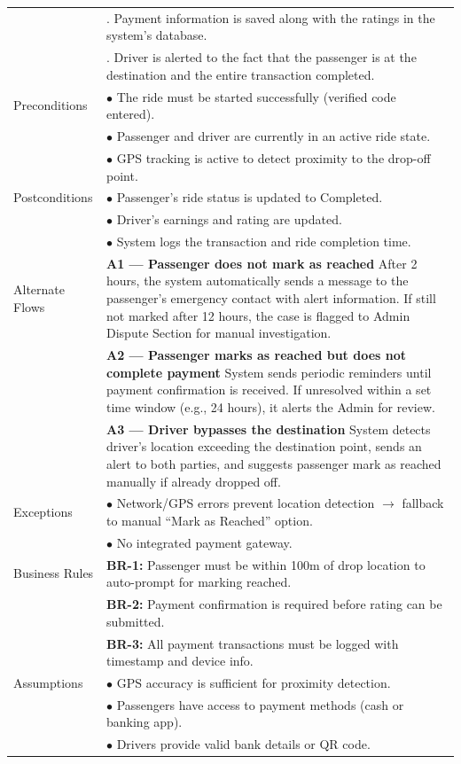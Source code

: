\begin{longtable}{|>{\raggedright\arraybackslash}p{4cm}|>{\raggedright\arraybackslash}p{11cm}|}
& 9. Payment information is saved along with the ratings in the system's database. \\
& 10. Driver is alerted to the fact that the passenger is at the destination and the entire transaction completed. \\
\hline
Preconditions & $\bullet$ The ride must be started successfully (verified code entered). \\
& $\bullet$ Passenger and driver are currently in an active ride state. \\
& $\bullet$ GPS tracking is active to detect proximity to the drop-off point. \\
\hline
Postconditions & $\bullet$ Passenger's ride status is updated to Completed. \\
& $\bullet$ Driver's earnings and rating are updated. \\
& $\bullet$ System logs the transaction and ride completion time. \\
\hline
Alternate Flows & \textbf{A1 — Passenger does not mark as reached} \newline After 2 hours, the system automatically sends a message to the passenger's emergency contact with alert information. If still not marked after 12 hours, the case is flagged to Admin Dispute Section for manual investigation. \\
& \textbf{A2 — Passenger marks as reached but does not complete payment} \newline System sends periodic reminders until payment confirmation is received. If unresolved within a set time window (e.g., 24 hours), it alerts the Admin for review. \\
& \textbf{A3 — Driver bypasses the destination} \newline System detects driver's location exceeding the destination point, sends an alert to both parties, and suggests passenger mark as reached manually if already dropped off. \\
\hline
Exceptions & $\bullet$ Network/GPS errors prevent location detection $\rightarrow$ fallback to manual ``Mark as Reached'' option. \\
& $\bullet$ No integrated payment gateway. \\
\hline
Business Rules & \textbf{BR-1:} Passenger must be within 100m of drop location to auto-prompt for marking reached. \\
& \textbf{BR-2:} Payment confirmation is required before rating can be submitted. \\
& \textbf{BR-3:} All payment transactions must be logged with timestamp and device info. \\
\hline
Assumptions & $\bullet$ GPS accuracy is sufficient for proximity detection. \\
& $\bullet$ Passengers have access to payment methods (cash or banking app). \\
& $\bullet$ Drivers provide valid bank details or QR code. \\
\hline
\end{longtable}

